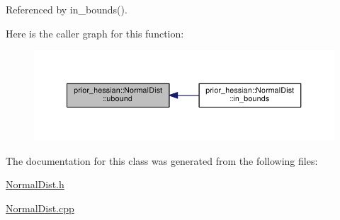 Referenced by in\+\_\+bounds().



Here is the caller graph for this function\+:\nopagebreak
\begin{figure}[H]
\begin{center}
\leavevmode
\includegraphics[width=350pt]{classprior__hessian_1_1NormalDist_a2da1def4f2ddde1507b978e2e79eaf9c_icgraph}
\end{center}
\end{figure}




The documentation for this class was generated from the following files\+:\begin{DoxyCompactItemize}
\item 
\hyperlink{NormalDist_8h}{Normal\+Dist.\+h}\item 
\hyperlink{NormalDist_8cpp}{Normal\+Dist.\+cpp}\end{DoxyCompactItemize}
